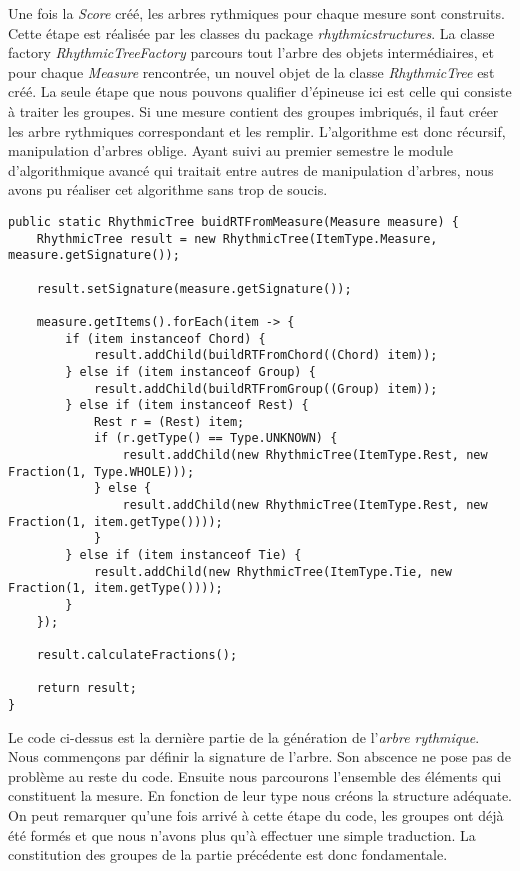 \par
Une fois la \emph{Score} créé, les arbres rythmiques pour chaque mesure sont construits. Cette étape est réalisée par les classes du package \emph{rhythmicstructures}. La classe factory \emph{RhythmicTreeFactory} parcours tout l'arbre des objets intermédiaires, et pour chaque \emph{Measure} rencontrée, un nouvel objet de la classe \emph{RhythmicTree} est créé. La seule étape que nous pouvons qualifier d'épineuse ici est celle qui consiste à traiter les groupes. Si une mesure contient des groupes imbriqués, il faut créer les arbre rythmiques correspondant et les remplir. L'algorithme est donc récursif, manipulation d'arbres oblige. Ayant suivi au premier semestre le module d'algorithmique avancé qui traitait entre autres de manipulation d'arbres, nous avons pu réaliser cet algorithme sans trop de soucis.

\begin{lstlisting}[caption=Exemple d'une balise beam de MusicXML]
public static RhythmicTree buidRTFromMeasure(Measure measure) {
	RhythmicTree result = new RhythmicTree(ItemType.Measure, measure.getSignature());

	result.setSignature(measure.getSignature());

	measure.getItems().forEach(item -> {
		if (item instanceof Chord) {
			result.addChild(buildRTFromChord((Chord) item));
		} else if (item instanceof Group) {
			result.addChild(buildRTFromGroup((Group) item));
		} else if (item instanceof Rest) {
			Rest r = (Rest) item;
			if (r.getType() == Type.UNKNOWN) {
				result.addChild(new RhythmicTree(ItemType.Rest, new Fraction(1, Type.WHOLE)));
			} else {
				result.addChild(new RhythmicTree(ItemType.Rest, new Fraction(1, item.getType())));
			}
		} else if (item instanceof Tie) {
			result.addChild(new RhythmicTree(ItemType.Tie, new Fraction(1, item.getType())));
		}
	});

	result.calculateFractions();

	return result;
}
\end{lstlisting}

\par
Le code ci-dessus est la dernière partie de la génération de l'\emph{arbre rythmique}. Nous commençons par définir la signature de l'arbre. Son abscence ne pose pas de problème au reste du code. Ensuite nous parcourons l'ensemble des éléments qui constituent la mesure. En fonction de leur type nous créons la structure adéquate. On peut remarquer qu'une fois arrivé à cette étape du code, les groupes ont déjà été formés et que nous n'avons plus qu'à effectuer une simple traduction. La constitution des groupes de la partie précédente est donc fondamentale.

